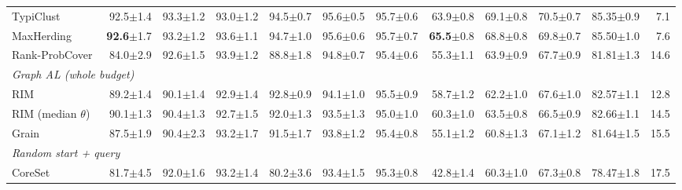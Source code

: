 \begin{table}[t]
\begin{adjustbox}{max width=\textwidth}
\begin{tabular}{lrrrrrrrrrrr}
\quad TypiClust~\cite{hacohen2022active} & 92.5{\scriptsize$\pm$1.4} & 93.3{\scriptsize$\pm$1.2} & 93.0{\scriptsize$\pm$1.2} & 94.5{\scriptsize$\pm$0.7} & 95.6{\scriptsize$\pm$0.5} & 95.7{\scriptsize$\pm$0.6} & 63.9{\scriptsize$\pm$0.8} & 69.1{\scriptsize$\pm$0.8} & 70.5{\scriptsize$\pm$0.7} & 85.35{\scriptsize$\pm$0.9} & 7.1 \\
\quad MaxHerding~\cite{bae2024generalized} & \textbf{92.6}{\scriptsize$\pm$1.7} & 93.2{\scriptsize$\pm$1.2} & 93.6{\scriptsize$\pm$1.1} & 94.7{\scriptsize$\pm$1.0} & 95.6{\scriptsize$\pm$0.6} & 95.7{\scriptsize$\pm$0.7} & \textbf{65.5}{\scriptsize$\pm$0.8} & 68.8{\scriptsize$\pm$0.8} & 69.8{\scriptsize$\pm$0.7} & 85.50{\scriptsize$\pm$1.0} & 7.6 \\
\quad Rank-ProbCover & 84.0{\scriptsize$\pm$2.9} & 92.6{\scriptsize$\pm$1.5} & 93.9{\scriptsize$\pm$1.2} & 88.8{\scriptsize$\pm$1.8} & 94.8{\scriptsize$\pm$0.7} & 95.4{\scriptsize$\pm$0.6} & 55.3{\scriptsize$\pm$1.1} & 63.9{\scriptsize$\pm$0.9} & 67.7{\scriptsize$\pm$0.9} & 81.81{\scriptsize$\pm$1.3} & 14.6 \\
\multicolumn{12}{l}{\textit{Graph AL (whole budget)}} \\
\quad RIM~\cite{zhang2021rim} & 89.2{\scriptsize$\pm$1.4} & 90.1{\scriptsize$\pm$1.4} & 92.9{\scriptsize$\pm$1.4} & 92.8{\scriptsize$\pm$0.9} & 94.1{\scriptsize$\pm$1.0} & 95.5{\scriptsize$\pm$0.9} & 58.7{\scriptsize$\pm$1.2} & 62.2{\scriptsize$\pm$1.0} & 67.6{\scriptsize$\pm$1.0} & 82.57{\scriptsize$\pm$1.1} & 12.8 \\
\quad RIM (median $\theta$)~\cite{zhang2021rim} & 90.1{\scriptsize$\pm$1.3} & 90.4{\scriptsize$\pm$1.3} & 92.7{\scriptsize$\pm$1.5} & 92.0{\scriptsize$\pm$1.3} & 93.5{\scriptsize$\pm$1.3} & 95.0{\scriptsize$\pm$1.0} & 60.3{\scriptsize$\pm$1.0} & 63.5{\scriptsize$\pm$0.8} & 66.5{\scriptsize$\pm$0.9} & 82.66{\scriptsize$\pm$1.1} & 14.5 \\
\quad Grain~\cite{zhang2021grain} & 87.5{\scriptsize$\pm$1.9} & 90.4{\scriptsize$\pm$2.3} & 93.2{\scriptsize$\pm$1.7} & 91.5{\scriptsize$\pm$1.7} & 93.8{\scriptsize$\pm$1.2} & 95.4{\scriptsize$\pm$0.8} & 55.1{\scriptsize$\pm$1.2} & 60.8{\scriptsize$\pm$1.3} & 67.1{\scriptsize$\pm$1.2} & 81.64{\scriptsize$\pm$1.5} & 15.5 \\
\multicolumn{12}{l}{\textit{Random start + query}} \\
\quad CoreSet~\cite{sener2017active} & 81.7{\scriptsize$\pm$4.5} & 92.0{\scriptsize$\pm$1.6} & 93.2{\scriptsize$\pm$1.4} & 80.2{\scriptsize$\pm$3.6} & 93.4{\scriptsize$\pm$1.5} & 95.3{\scriptsize$\pm$0.8} & 42.8{\scriptsize$\pm$1.4} & 60.3{\scriptsize$\pm$1.0} & 67.3{\scriptsize$\pm$0.8} & 78.47{\scriptsize$\pm$1.8} & 17.5 \\

\end{tabular}
\end{adjustbox}
\end{table}
